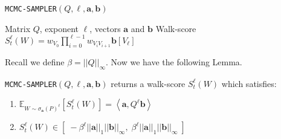\begin{algorithm}[ht]
\caption{\texttt{MCMC-SAMPLER}$(Q, {\ell}, \mathbf{a}, \mathbf{b})$}
\label{alg:fwalk}
\begin{algorithmic}[1]
\REQUIRE Matrix $Q$, exponent ${\ell}$, vectors $\mathbf{a}$ and $\mathbf{b}$
\RETURN Walk-score $S_{t}^{\ell}(W) = w_{V_0}\prod_{i=0}^{{\ell}-1}w_{V_iV_{i+1}}\mathbf{b}[V_{\ell}]$
\end{algorithmic}
\end{algorithm} 


Recall we define $\beta = ||Q||_{\infty}$. 
Now we have the following Lemma.
\begin{lemma}
\label{lem:mcmc}	
\texttt{MCMC-SAMPLER}$(Q, {\ell},\mathbf{a},\mathbf{b})$ returns a walk-score $S_{t}^{\ell}(W)$ which satisfies:
\begin{enumerate}
\item $\mathbb{E}_{W \sim \sigma_{\mathbf{a}}(P)^{\ell}} \left[S_{t}^{\ell}(W)\right] = \left<\mathbf{a}, Q^{\ell}\mathbf{b} \right>$
\item $S_{t}^{\ell}(W) \in [\;-\beta^{\ell}||\mathbf{a}||_1||\mathbf{b}||_{\infty} ,\; \beta^{\ell}||\mathbf{a}||_1||\mathbf{b}||_{\infty} \;]$
\end{enumerate}
\end{lemma}


